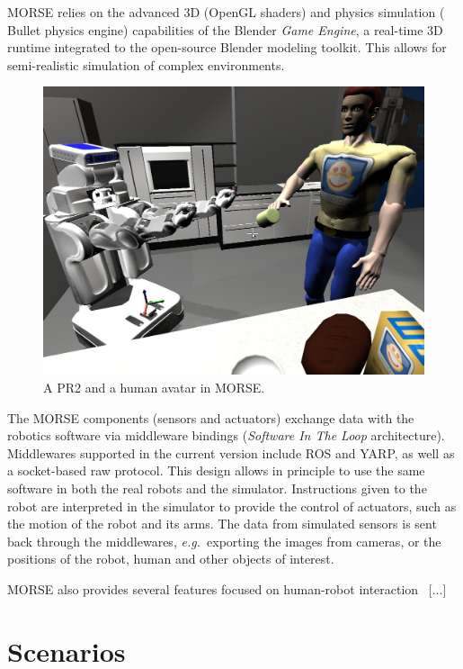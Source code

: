 \documentclass[conference]{IEEEtran}
\newcommand{\eg}{{\textit{e.g.~}}}
\begin{document}
MORSE relies on the advanced 3D (OpenGL shaders) and physics simulation ({\sc
Bullet} physics engine) capabilities of the Blender \emph{Game Engine}, a
real-time 3D runtime integrated to the open-source Blender modeling toolkit.
This allows for semi-realistic simulation of complex environments.

\begin{figure}[t]
      \centering
      \includegraphics[width=0.9\linewidth]{morse_pr2.jpg}
      \caption{A PR2 and a human avatar in MORSE.}
      \label{fig|morse-hri}
\end{figure}

The MORSE components (sensors and actuators) exchange data with the robotics
software via middleware bindings (\emph{Software In The Loop} architecture). Middlewares supported in the current version include ROS and YARP,
as well as a socket-based raw protocol. This design allows in principle to use
the same software in both the real robots and the simulator. Instructions given
to the robot are interpreted in the simulator to provide the control of
actuators, such as the motion of the robot and its arms.  The data from
simulated sensors is sent back through the middlewares, \eg exporting the
images from cameras, or the positions of the robot, human and other objects of
interest.

MORSE also provides several features focused on human-robot interaction~\cite{lemaignan2012morse} [...]

\section{Scenarios}
\end{document}
